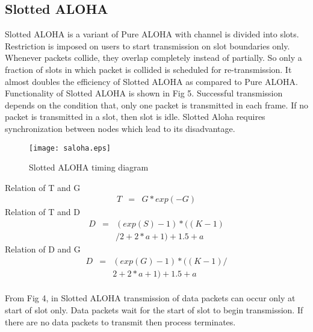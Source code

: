 \documentclass[11pt, conference, compsocconf, onecolumn]{IEEEtran}
\begin{document}
\subsection{Slotted ALOHA}
Slotted ALOHA is a variant of Pure ALOHA with channel is divided into slots. Restriction is imposed on users to start transmission on slot boundaries only. Whenever packets collide, they overlap completely instead of partially. So only a fraction of slots in which packet is collided is scheduled for re-transmission. It almost doubles the efficiency of Slotted ALOHA as compared to Pure ALOHA.
Functionality of Slotted ALOHA is shown in Fig 5. Successful transmission depends on the condition that, only one packet is transmitted in each frame. If no packet is transmitted in a slot, then slot is idle. Slotted Aloha requires synchronization between nodes which lead to its disadvantage.
\begin{figure}[!h]
\centering
\caption{Slotted ALOHA timing diagram}
\texttt{[image: saloha.eps]}
\end{figure}
Relation of T and G
\begin{eqnarray}
T&=&G*exp(-G)
\end{eqnarray}
Relation of T and D
\begin{eqnarray}
D&=&(exp(S)-1)*((K-1)\nonumber\\
& &/2+2*a+1)+1.5+a
\end{eqnarray}
Relation of D and G
\begin{eqnarray}
D&=&(exp(G)-1)*((K-1)/ \nonumber\\
& &2+2*a+1)+1.5+a
\end{eqnarray}
\\
\indent From Fig 4, in Slotted ALOHA transmission of data packets can occur only at start of slot only. Data packets wait for the start of slot to begin transmission.
If there are no data packets to transmit then process terminates.
\end{document}
